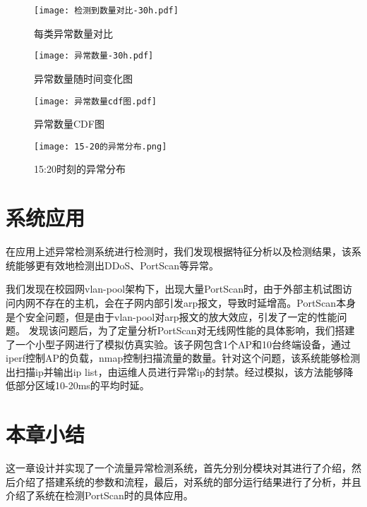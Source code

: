 
\begin{figure}
  \centering
  \texttt{[image: 检测到数量对比-30h.pdf]}
  \caption{每类异常数量对比}
  \label{fig:每类异常数量对比}
\end{figure}


\begin{figure}
  \centering
  \texttt{[image: 异常数量-30h.pdf]}
  \caption{异常数量随时间变化图}
  \label{fig:异常数量}
\end{figure}

\begin{figure}[htbp]
  \centering
  \begin{minipage}[t]{0.48\textwidth}
  \centering
  \texttt{[image: 异常数量cdf图.pdf]}
  \caption{异常数量CDF图}
  \end{minipage}
  \begin{minipage}[t]{0.48\textwidth}
  \centering
  \texttt{[image: 15-20的异常分布.png]}
  \caption{15:20时刻的异常分布}
  \end{minipage}
  \end{figure}

\section{系统应用}
在应用上述异常检测系统进行检测时，我们发现根据特征分析以及检测结果，该系统能够更有效地检测出DDoS、PortScan等异常。

我们发现在校园网vlan-pool架构下，出现大量PortScan时，由于外部主机试图访问内网不存在的主机，会在子网内部引发arp报文，导致时延增高。PortScan本身是个安全问题，但是由于vlan-pool对arp报文的放大效应，引发了一定的性能问题。
发现该问题后，为了定量分析PortScan对无线网性能的具体影响，我们搭建了一个小型子网进行了模拟仿真实验。该子网包含1个AP和10台终端设备，通过iperf控制AP的负载，nmap控制扫描流量的数量。针对这个问题，该系统能够检测出扫描ip并输出ip list，由运维人员进行异常ip的封禁。经过模拟，该方法能够降低部分区域10-20ms的平均时延。

\section{本章小结}
这一章设计并实现了一个流量异常检测系统，首先分别分模块对其进行了介绍，然后介绍了搭建系统的参数和流程，最后，对系统的部分运行结果进行了分析，并且介绍了系统在检测PortScan时的具体应用。